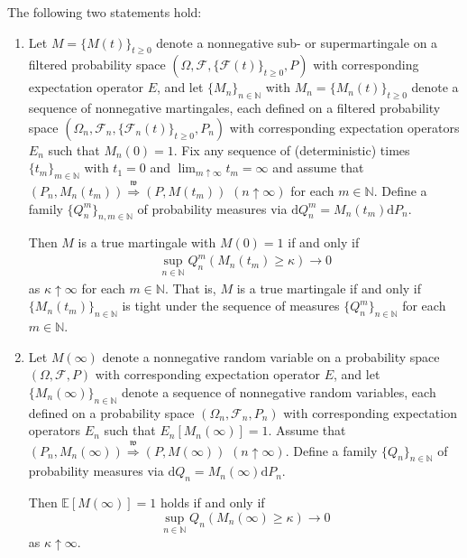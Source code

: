 \begin{theorem}
The following two statements hold: \label{T mainmain}

\begin{enumerate}
\item Let $M=\{M\left( t\right) \}_{t\geq0}$ denote a nonnegative sub- or
supermartingale on a filtered probability space $\left( \Omega,\mathcal{F},
\{\mathcal{F}(t)\}_{t \geq0}, P\right) $ with corresponding expectation
operator $E$, and let $\{M_{n}\}_{n \in\mathbb{N}}$ with $%
M_{n}=\{M_{n}\left( t\right) \}_{t\geq0}$ denote a sequence of nonnegative
martingales, each defined on a filtered probability space $\left( \Omega_{n},%
\mathcal{F}_{n}, \{\mathcal{F}_{n}(t)\}_{t \geq0}, P_{n}\right) $ with
corresponding expectation operators $E_{n}$ such that $M_{n}(0) = 1$. Fix
any sequence of (deterministic) times $\{t_{m}\}_{m\in \mathbb{N}}$ with $%
t_{1}=0$ and $\lim_{m\uparrow \infty }t_{m}=\infty $ and assume that $%
(P_{n},M_{n}(t_{m}))\overset{\mathfrak{w}}{\Longrightarrow }(P,M(t_{m}))$ $%
(n \uparrow \infty)$ for each $m\in \mathbb{N}$. Define a family $%
\{Q_{n}^{m}\}_{n,m \in\mathbb{N}}$ of probability measures via $\mathrm{d}%
Q_{n}^{m}=M_{n}(t_{m})\mathrm{d}P_{n}$.

Then $M$ is a true martingale with $M(0)=1$ if and only if
\begin{align}  \label{E Q tightness}
\sup_{n\in \mathbb{N}}Q_{n}^{m}(M_{n}(t_{m})\geq \kappa )\rightarrow 0
\end{align}%
as $\kappa \uparrow \infty $ for each $m\in \mathbb{N}$. That is, $M$ is a
true martingale if and only if $\{M_{n}(t_{m})\}_{n\in \mathbb{N}}$ is tight
under the sequence of measures $\{Q_{n}^{m}\}_{n\in \mathbb{N}}$ for each $%
m\in \mathbb{N}$.

\item Let $M(\infty)$ denote a nonnegative random variable on a probability
space $\left( \Omega,\mathcal{F}, P\right) $ with corresponding expectation
operator $E$, and let $\{M_{n}(\infty)\}_{n \in\mathbb{N}}$ denote a
sequence of nonnegative random variables, each defined on a probability
space $\left( \Omega_{n},\mathcal{F}_{n}, P_{n}\right) $ with corresponding
expectation operators $E_{n}$ such that $E_n[M_{n}(\infty)] = 1$. Assume
that $(P_{n},M_{n}(\infty))\overset{\mathfrak{w}}{\Longrightarrow }%
(P,M(\infty))$ $(n \uparrow \infty)$. Define a family $\{Q_{n}\}_{n \in%
\mathbb{N}}$ of probability measures via $\mathrm{d}Q_{n}=M_{n}(\infty)%
\mathrm{d}P_{n}$.

Then ${\mathbb{E}}[M(\infty)]=1$ holds if and only if
\begin{equation*}
\sup_{n\in \mathbb{N}}Q_{n}(M_{n}(\infty )\geq \kappa )\rightarrow 0
\end{equation*}%
 as $\kappa \uparrow \infty $.
\end{enumerate}
\end{theorem}

